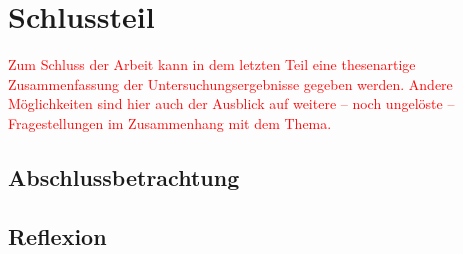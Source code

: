 \section{Schlussteil}
\textcolor{red}{Zum Schluss der Arbeit kann in dem letzten Teil eine thesenartige Zusammenfassung der Untersuchungsergebnisse gegeben werden. Andere Möglichkeiten sind hier auch der Ausblick auf weitere – noch ungelöste – Fragestellungen im Zusammenhang mit dem Thema.}

\subsection{Abschlussbetrachtung}
\textcolor{red}{\blindtext}

\subsection{Reflexion}
\textcolor{red}{\blindtext}

